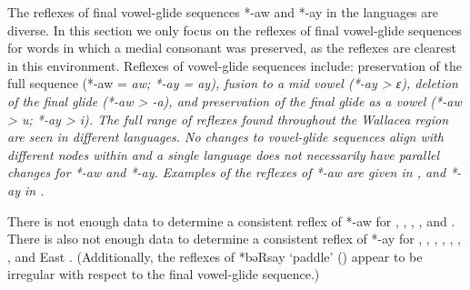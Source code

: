 The reflexes of final vowel-glide sequences *-aw
and *-ay in the  languages are diverse.
 In this section we only focus on the reflexes of final vowel-glide
sequences for words in which a medial consonant was preserved,
as the reflexes are clearest in this environment.
Reflexes of vowel-glide sequences include: preservation of the
full sequence (*-aw = \it{aw;} *-ay = \it{ay}),
fusion to a mid vowel (*-ay > \it{ɛ}),
deletion of the final glide (*-aw \it{>} -\it{a}),
and preservation of the final glide as a vowel (*-aw > \it{u}; *-ay > \it{i}).
The full range of reflexes found throughout the Wallacea region
are seen in different  languages.
No changes to vowel-glide sequences align with different nodes
within  and a single language does not necessarily have parallel changes
for *-aw and *-ay.
Examples of the reflexes of *-aw are given in ,
and *-ay in .

There is not enough data to determine a consistent reflex of
*-aw for , , , , and .
There is also not enough data to determine a consistent reflex
of *-ay for ,
, , , ,
, , and East .
(Additionally, the reflexes of *bəRsay ‘paddle’ ()
appear to be irregular with respect to the final vowel-glide
sequence.) 


